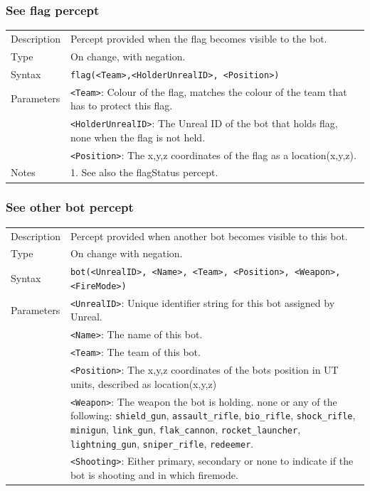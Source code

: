 \documentclass[11pt,a4paper]{article}
\begin{document}
\subsubsection*{See flag percept}
\begin{small}
\begin{tabular}{p{2cm}p{9cm}}
Description & Percept provided when the flag becomes visible to the bot. \\
Type & On change, with negation.\\
Syntax & \verb|flag(<Team>,<HolderUnrealID>, <Position>)|\\
Parameters & 
	\verb|<Team>|: Colour of the flag, matches the colour of the team that has to protect this flag.\\
& \verb|<HolderUnrealID>|: The Unreal ID of the bot that holds flag, none when the flag is not held.\\
& \verb|<Position>|: The x,y,z coordinates of the flag as a location(x,y,z).\\

Notes &
	1.	See also the flagStatus percept.
\end{tabular}
\end{small}

\subsubsection*{See other bot percept}
\begin{small}
\begin{tabular}{p{2cm}p{9cm}}
Description & Percept provided when another bot becomes visible to this bot.\\
Type & On change with negation.\\
Syntax & \verb|bot(<UnrealID>, <Name>, <Team>, <Position>, <Weapon>, <FireMode>)|\\
Parameters &
	\verb|<UnrealID>|: Unique identifier string for this bot assigned by Unreal.\\
&	\verb|<Name>|: The name of this bot.\\
&	\verb|<Team>|: The team of this bot.\\
&	\verb|<Position>|: The x,y,z coordinates of the bots position in UT units, described as location(x,y,z)\\
&	\verb|<Weapon>|: The weapon the bot is holding. none or any of the following: \verb|shield_gun|, \verb|assault_rifle|, \verb|bio_rifle|, \verb|shock_rifle|, \verb|minigun|, \verb|link_gun|, \verb|flak_cannon|, \verb|rocket_launcher|, \verb|lightning_gun|, \verb|sniper_rifle|, \verb|redeemer|.\\
&	\verb|<Shooting>|: Either primary, secondary or none to indicate if the bot is shooting and in which firemode.
\end{tabular}
\end{small}
\end{document}
